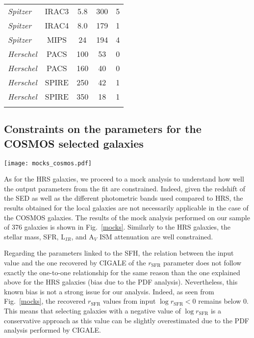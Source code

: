 \documentclass[traditabstract]{aa} %
\begin{document}
\begin{table}
\begin{tabular}{l c c c c}
	\textit{Spitzer} & IRAC3 & 5.8& 300 & 5\\	
	\textit{Spitzer} & IRAC4 & 8.0& 179 & 1\\
	\textit{Spitzer} & MIPS & 24& 194 & 4\\	
	\textit{Herschel} & PACS & 100& 53 &  0\\
	\textit{Herschel} & PACS & 160& 40 & 0\\
	\textit{Herschel} & SPIRE & 250& 42 & 1\\
	\textit{Herschel} & SPIRE & 350& 18&  1\\
	\hline
	\label{bands}
	\end{tabular}
\end{table}


\subsection{Constraints on the parameters for the COSMOS selected galaxies}
\begin{figure*}[!h] 
  	\texttt{[image: mocks\_cosmos.pdf]}
  	\caption{\label{mocks} Results of the mock analysis. The input parameters used to build the mock catalogue are shown on the x-axis while the results of the fitting of the mock catalogues are shown on the y-axis. A good constraint on a given parameter is obtained when there is a one-to-one relationship, which is indicated by the black solid lines. Grey dots are all sources selected from the \cite{Aufort20} sample while blue circles are the galaxies composing the final sample.}
\end{figure*}

As for the HRS galaxies, we proceed to a mock analysis to understand how well the output parameters from the fit are constrained.
Indeed, given the redshift of the SED as well as the different photometric bands used compared to HRS, the results obtained for the local galaxies are not necessarily applicable in the case of the COSMOS galaxies.
The results of the mock analysis performed on our sample of 376 galaxies is shown in Fig.~\ref{mocks}.
Similarly to the HRS galaxies, the stellar mass, SFR, L$_{IR}$, and A$_V$ ISM attenuation are well constrained. 

Regarding the parameters linked to the SFH, the relation between the input value and the one recovered by CIGALE of the $r_{\mathrm{SFR}}$ parameter does not follow exactly the one-to-one relationship for the same reason than the one explained above for the HRS galaxies (bias due to the PDF analysis).
Nevertheless, this known bias is not a strong issue for our analysis.
Indeed, as seen from Fig.~\ref{mocks}, the recovered $r_{\mathrm{SFR}}$ values from input $\log r_{\mathrm{SFR}} < 0$ remains below 0.
This means that selecting galaxies with a negative value of $\log r_{\mathrm{SFR}}$ is a conservative approach as this value can be slightly overestimated due to the PDF analysis performed by CIGALE.
\end{document}
